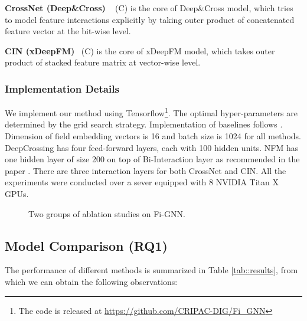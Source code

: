 \documentclass[sigconf]{acmart}
\begin{document}
\textbf{CrossNet (Deep\&Cross) }~\cite{wang2017deep} (C) is the core of Deep\&Cross model, which tries to model feature interactions explicitly by taking outer product of concatenated feature vector at the bit-wise level.

\textbf{CIN (xDeepFM)}~\cite{lian2018xdeepfm} (C) is the core of xDeepFM model, which takes outer product of stacked feature matrix at vector-wise level.





\subsubsection{Implementation Details}
We implement our method using Tensorflow\footnote{The code is released at \url{https://github.com/CRIPAC-DIG/Fi_GNN}}. The optimal hyper-parameters are determined by the grid search strategy. 
Implementation of baselines follows \cite{song2018autoint}.
Dimension of field embedding vectors is 16 and batch size is 1024 for all methods. 
DeepCrossing has four feed-forward layers, each with 100 hidden units.  
NFM has one hidden layer of size 200 on top of Bi-Interaction layer as recommended in the paper \cite{he2017neural}. 
There are three interaction layers for both CrossNet and CIN. 
All the experiments were conducted over a sever equipped with 8 NVIDIA Titan X GPUs.


\begin{figure*}[hbtp]
\caption{Two groups of ablation studies on Fi-GNN.}
\label{fig:performance}
\end{figure*}


\subsection{Model Comparison (RQ1)}\label{sect:result}
The performance of different methods is summarized in Table \ref{tab::results}, from which we can obtain the following observations:
 
\end{document}

